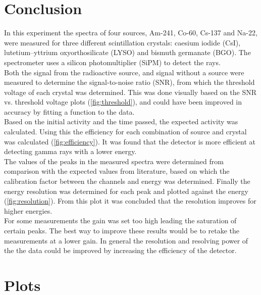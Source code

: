 \documentclass[a4paper, 11pt, table]{article}
\begin{document}
\section{Conclusion}
In this experiment the spectra of four sources, Am-241, Co-60, Cs-137 and Na-22, were measured for three different scintillation crystals: caesium iodide (CsI), lutetium–yttrium oxyorthosilicate (LYSO) and bismuth germanate (BGO). The spectrometer uses a silicon photomultiplier (SiPM) to detect the rays.\\

Both the signal from the radioactive source, and signal without a source were measured to determine the signal-to-noise ratio (SNR), from which the threshold voltage of each crystal was determined. This was done visually based on the SNR vs. threshold voltage plots (\cref{fig:threshold}), and could have been improved in accuracy by fitting a function to the data. \\

Based on the initial activity and the time passed, the expected activity was calculated. Using this the efficiency for each combination of source and crystal was calculated (\cref{fig:efficiency}). It was found that the detector is more efficient at detecting gamma rays with a lower energy.\\

The values of the peaks in the measured spectra were determined from comparison with the expected values from literature, based on which the calibration factor between the channels and energy was determined. Finally the energy resolution was determined for each peak and plotted against the energy (\cref{fig:resolution}). From this plot it was concluded that the resolution improves for higher energies.\\

For some measurements the gain was set too high leading the saturation of certain peaks. The best way to improve these results would be to retake the measurements at a lower gain. In general the resolution and resolving power of the the data could be improved by increasing the efficiency of the detector.


\printbibliography
\appendix
\section{Plots} \label{app: data analysis}
\end{document}
